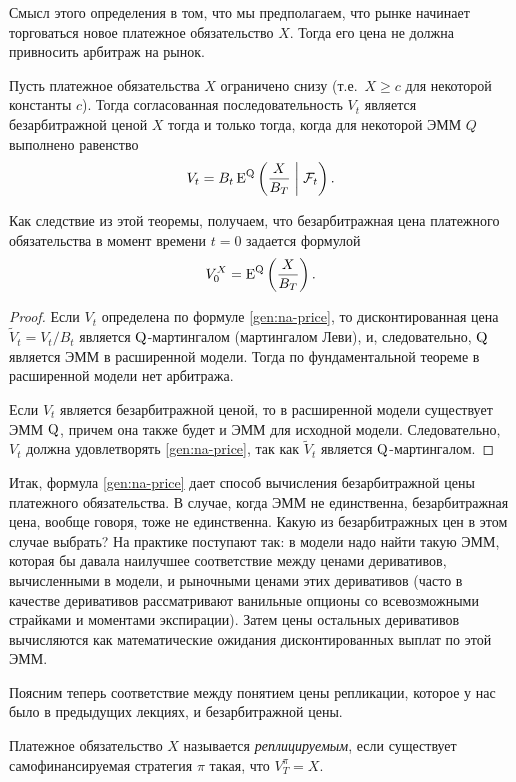 Смысл этого определения в том, что мы предполагаем, что рынке начинает торговаться новое платежное обязательство $X$.
Тогда его цена не должна привносить арбитраж на рынок.

\begin{theorem}
\label{gen:t:price}
Пусть платежное обязательства $X$ ограничено снизу (т.е.\ $X\ge c$ для некоторой константы $c$). 
Тогда согласованная последовательность $V_t$ является безарбитражной ценой $X$ тогда и только тогда, когда для некоторой ЭММ $Q$ выполнено равенство
\begin{equation}
\label{gen:na-price}
V_t =  B_t \operatorname{E}^{\mathrm{Q}} \left( \frac{X}{B_T} \;\bigg|\; \mathcal{F}_t \right).
\end{equation}
\end{theorem}
Как следствие из этой теоремы, получаем, что безарбитражная цена платежного обязательства в момент времени $t=0$ задается формулой
\[
V_0^X = \operatorname{E}^{\mathrm{Q}} \left( \frac{X}{B_T} \right).
\]

\begin{proof}
Если $V_t$ определена по формуле \eqref{gen:na-price}, то дисконтированная цена $\tilde V_t = V_t/B_t$ является $\mathrm{Q}$-мартингалом (мартингалом Леви), и, следовательно, $\mathrm{Q}$ является ЭММ в расширенной модели.
Тогда по фундаментальной теореме в расширенной модели нет арбитража.

Если $V_t$ является безарбитражной ценой, то в расширенной модели существует ЭММ $\mathrm{Q}$, причем она также будет и ЭММ для исходной модели.
Следовательно, $V_t$ должна удовлетворять \eqref{gen:na-price}, так как $\tilde V_t$ является $\mathrm{Q}$-мартингалом.
\end{proof}

Итак, формула \eqref{gen:na-price} дает способ вычисления безарбитражной цены платежного обязательства.
В случае, когда ЭММ не единственна, безарбитражная цена, вообще говоря, тоже не единственна. 
Какую из безарбитражных цен в этом случае выбрать?
На практике поступают так: в модели надо найти такую ЭММ, которая бы давала наилучшее соответствие между ценами деривативов, вычисленными в модели, и рыночными ценами этих деривативов (часто в качестве деривативов рассматривают ванильные опционы со всевозможными страйками и моментами экспирации).
Затем цены остальных деривативов вычисляются как математические ожидания дисконтированных выплат по этой ЭММ.

Поясним теперь соответствие между понятием цены репликации, которое у нас было в предыдущих лекциях, и безарбитражной цены.

\begin{definition}
Платежное обязательство $X$ называется \emph{реплицируемым}, если существует самофинансируемая стратегия $\pi$ такая, что $V_T^\pi = X$.
\end{definition}

